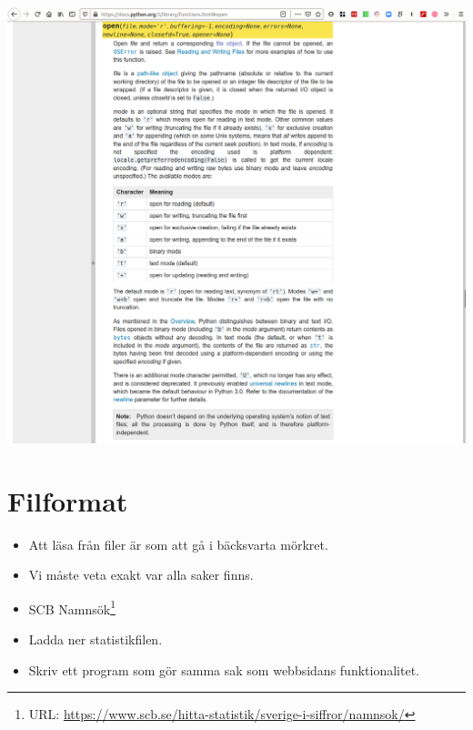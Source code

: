 \begin{frame}
  \includegraphics[width=\columnwidth]{figs/docs-open.png}
\end{frame}


\section{Filformat}

\begin{frame}[fragile]
  \begin{remark}
    \begin{itemize}
      \item Att läsa från filer är som att gå i bäcksvarta mörkret.
      \item Vi måste veta exakt var alla saker finns.
    \end{itemize}
  \end{remark}
\end{frame}

\begin{frame}
  \begin{exercise}
    \begin{itemize}
      \item SCB Namnsök\footnote{%
          URL: \url{https://www.scb.se/hitta-statistik/sverige-i-siffror/namnsok/}
        }
      \item Ladda ner statistikfilen.
      \item Skriv ett program som gör samma sak som webbsidans funktionalitet.
    \end{itemize}
  \end{exercise}
\end{frame}

